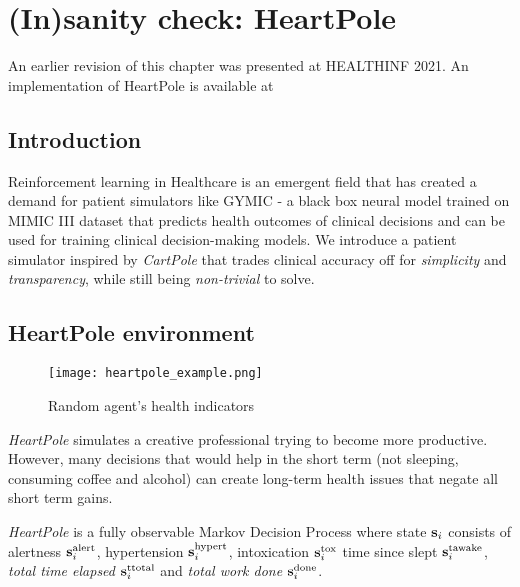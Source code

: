 \chapter{(In)sanity check: HeartPole}
\label{ch:heartpole}

\begin{remark}
    An earlier revision \cite{heartpole} of this chapter was presented at HEALTHINF 2021. An implementation of HeartPole is available at \cite{liventsevVadim0x60Heartpole2024} 
\end{remark}


\section{Introduction}
\label{sec:heartpole-introduction}

Reinforcement learning in Healthcare is an emergent field that has created a demand for patient simulators like GYMIC \cite{gym-sepsis} - a black box neural model trained on MIMIC III dataset \cite{johnsonMIMICIIIFreelyAccessible2016} that predicts health outcomes of clinical decisions and can be used for training clinical decision-making models. We introduce a patient simulator inspired by \emph{CartPole} \cite{cartpole} that trades clinical accuracy off for \emph{simplicity} and \emph{transparency}, while still being \emph{non-trivial} to solve.

\section{HeartPole environment}
\label{sec:heartpole-methodology}

\begin{figure}
    \centering
    \texttt{[image: heartpole\_example.png]}
    \caption{Random agent's health indicators}
    \label{fig:random}
\end{figure}

\emph{HeartPole} simulates a creative professional trying to become more productive.
However, many decisions that would help in the short term (not sleeping, consuming coffee and alcohol) can create long-term health issues that negate all short term gains.

\emph{HeartPole} is a fully observable Markov Decision Process \cite{mdp} where state $\textbf{s}_i$ consists of alertness $\textbf{s}^\text{alert}_i$, hypertension $\textbf{s}^\text{hypert}_i$, intoxication $\textbf{s}^\text{tox}_i$ time since slept $\textbf{s}^\text{tawake}_i$, \emph{total time elapsed} $\textbf{s}^\text{ttotal}_i$ and \emph{total work done} $\textbf{s}^\text{done}_i$.

